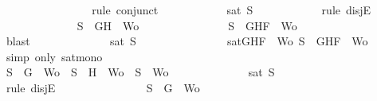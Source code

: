 \begin{isabellebody}
\ \ \ \ \ \ \ \ \ \ \ \ \isamarkupfalse%
\ {}\ \isamarkupfalse%
\ {\isacharparenleft}rule\ conjunct{}{\isacharparenright}\isanewline
\ \ \ \ \ \ \ \ \ \ \isamarkupfalse%
\ {\isachardoublequoteopen}sat\ S{\isachardoublequoteclose}\isanewline
\ \ \ \ \ \ \ \ \ \ \isamarkupfalse%
\ {\isacharparenleft}rule\ disjE{\isacharparenright}\isanewline
\ \ \ \ \ \ \ \ \ \ \ \ \isamarkupfalse%
\ {\isachardoublequoteopen}S\ {\isacharequal}\ {\isacharbraceleft}G{\isacharcomma}H{\isacharbraceright}\ {\isasymunion}\ Wo{\isachardoublequoteclose}\isanewline
\ \ \ \ \ \ \ \ \ \ \ \ \isamarkupfalse%
\ \isamarkupfalse%
\ {\isachardoublequoteopen}S\ {\isasymsubseteq}\ {\isacharbraceleft}G{\isacharcomma}H{\isacharcomma}F{\isacharbraceright}\ {\isasymunion}\ Wo{\isachardoublequoteclose}\isanewline
\ \ \ \ \ \ \ \ \ \ \ \ \ \ \isamarkupfalse%
\ blast\isanewline
\ \ \ \ \ \ \ \ \ \ \ \ \isamarkupfalse%
\ {\isachardoublequoteopen}sat\ S{\isachardoublequoteclose}\isanewline
\ \ \ \ \ \ \ \ \ \ \ \ \ \ \isamarkupfalse%
\ {\isacartoucheopen}sat{\isacharparenleft}{\isacharbraceleft}G{\isacharcomma}H{\isacharcomma}F{\isacharbraceright}\ {\isasymunion}\ Wo{\isacharparenright}{\isacartoucheclose}\ {\isacartoucheopen}S\ {\isasymsubseteq}\ {\isacharbraceleft}G{\isacharcomma}H{\isacharcomma}F{\isacharbraceright}\ {\isasymunion}\ Wo{\isacartoucheclose}\ \isamarkupfalse%
\ {\isacharparenleft}simp\ only{\isacharcolon}\ sat{\isacharunderscore}mono{\isacharparenright}\isanewline
\ \ \ \ \ \ \ \ \ \ \isamarkupfalse%
\isanewline
\ \ \ \ \ \ \ \ \ \ \ \ \isamarkupfalse%
\ {\isachardoublequoteopen}S\ {\isacharequal}\ {\isacharbraceleft}G{\isacharbraceright}\ {\isasymunion}\ Wo\ {\isasymor}\ S\ {\isacharequal}\ {\isacharbraceleft}H{\isacharbraceright}\ {\isasymunion}\ Wo\ {\isasymor}\ S\ {\isacharequal}\ Wo{\isachardoublequoteclose}\isanewline
\ \ \ \ \ \ \ \ \ \ \ \ \isamarkupfalse%
\ {\isachardoublequoteopen}sat\ S{\isachardoublequoteclose}\isanewline
\ \ \ \ \ \ \ \ \ \ \ \ \isamarkupfalse%
\ {\isacharparenleft}rule\ disjE{\isacharparenright}\isanewline
\ \ \ \ \ \ \ \ \ \ \ \ \ \ \isamarkupfalse%
\ {\isachardoublequoteopen}S\ {\isacharequal}\ {\isacharbraceleft}G{\isacharbraceright}\ {\isasymunion}\ Wo{\isachardoublequoteclose}\isanewline
\ \ \ \ \ \ \ \ \ \ \ \ \ \ \isamarkupfalse%
\ \isamarkupfalse%

\end{isabellebody}
